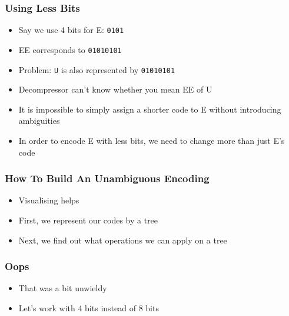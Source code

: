 \documentclass{../ucll-slides}
\begin{document}
\begin{frame}
  \frametitle{Using Less Bits}
  \begin{itemize}
    \item Say we use 4 bits for E: \texttt{0101}
    \item EE corresponds to \texttt{01010101}
    \item Problem: {\tt U} is also represented by \texttt{01010101}
    \item Decompressor can't know whether you mean EE of U
    \item It is impossible to simply assign a shorter code to E without introducing ambiguities
    \item In order to encode E with less bits, we need to change more than just E's code
  \end{itemize}
\end{frame}

\begin{frame}
  \frametitle{How To Build An Unambiguous Encoding}
  \begin{itemize}
    \item Visualising helps
    \item First, we represent our codes by a tree
    \item Next, we find out what operations we can apply on a tree
  \end{itemize}
\end{frame}



\begin{frame}
  \frametitle{Oops}
  \begin{itemize}
    \item That was a bit unwieldy
    \item Let's work with 4 bits instead of 8 bits
  \end{itemize}
\end{frame}
\end{document}
